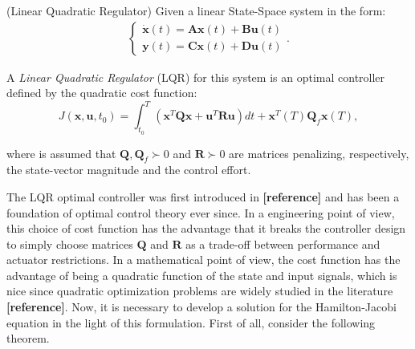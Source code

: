 \documentclass[a4paper,11pt]{book}
\numberwithin{figure}{chapter}
\numberwithin{equation}{chapter}
\numberwithin{table}{chapter}
\theoremstyle{definition}
\newtheorem{definition}{Definition}[chapter]
\newcounter{boxed-theorem}
\newcounter{boxed-definition}
\newenvironment{boxed-definition}[1]
{\begin{shaded} \begin{definition}{#1}}
{\end{definition} \end{shaded}}
\begin{document}
\begin{boxed-definition}{(Linear Quadratic Regulator)} \label{def:lqr}
    Given a linear State-Space system in the form:
    \begin{align}
    \begin{cases}
        \dot{\bm{x}}(t) = \bm{A} \bm{x}(t) + \bm{B} \bm{u}(t) \\
        \bm{y}(t) = \bm{C} \bm{x}(t) + \bm{D} \bm{u}(t)
    \end{cases}
    .\end{align}
    
    A \textit{Linear Quadratic Regulator} (LQR) for this system is an optimal controller defined by the quadratic cost function:
    \begin{equation}
        J(\bm{x}, \bm{u}, t_0) = \int_{t_0}^{T} \left( \bm{x}^T \bm{Q} \bm{x} + \bm{u}^T \bm{R} \bm{u} \right) dt + \bm{x}^T(T) \bm{Q}_f \bm{x}(T)
    ,\end{equation}
    
    \noindent where is assumed that $\bm{Q},\bm{Q}_f  \succ 0$ and $\bm{R} \succ 0$ are matrices penalizing, respectively, the state-vector magnitude and the control effort.
\end{boxed-definition}

The LQR optimal controller was first introduced in \textbf{[reference]} and has been a foundation of optimal control theory ever since. In a engineering point of view, this choice of cost function has the advantage that it breaks the controller design to simply choose matrices $\bm{Q}$ and $\bm{R}$ as a trade-off between performance and actuator restrictions. In a mathematical point of view, the cost function has the advantage of being a quadratic function of the state and input signals, which is nice since quadratic optimization problems are widely studied in the literature \textbf{[reference]}. Now, it is necessary to develop a solution for the Hamilton-Jacobi equation in the light of this formulation. First of all, consider the following theorem.
\end{document}
